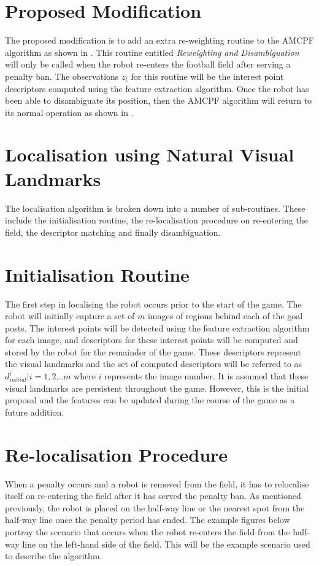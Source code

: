 \section{Proposed Modification}
\label{sec:modification}
The proposed modification is to add an extra re-weighting routine to the AMCPF algorithm as shown in . This routine entitled \textit{Reweighting and Disambiguation} will only be called when the robot re-enters the football field after serving a penalty ban. The observations $z_t$ for this routine will be the interest point descriptors computed using the feature extraction algorithm. Once the robot has been able to disambiguate its position, then the AMCPF algorithm will return to its normal operation as shown in .\\

\section{Localisation using Natural Visual Landmarks}
\label{sec:localisationNaturalVisualLandmarks}
The localisation algorithm is broken down into a number of sub-routines. These include the initialisation routine, the re-localisation procedure on re-entering the field, the descriptor matching and finally disambiguation.\\

\section{Initialisation Routine}
\label{sec:initialisation}
The first step in localising the robot occurs prior to the start of the game. The robot will initially capture a set of $m$ images of regions behind each of the goal posts. The interest points will be detected using the feature extraction algorithm for each image, and descriptors for these interest points will be computed and stored by the robot for the remainder of the game. These descriptors represent the visual landmarks and the set of computed descriptors will be referred to as $d_{initial}^i |i = 1,2...m$ where $i$ represents the image number. It is assumed that these visual landmarks are persistent throughout the game. However, this is the initial proposal and the features can be updated during the course of the game as a future addition.\\

\section{Re-localisation Procedure}
\label{sec:relocalisation}
When a penalty occurs and a robot is removed from the field, it has to relocalise itself on re-entering the field after it has served the penalty ban. As mentioned previously, the robot is placed on the half-way line or the nearest spot from the half-way line once the penalty period has ended. The example figures below portray the scenario that occurs when the robot re-enters the field from the half-way line on the left-hand side of the field. This will be the example scenario used to describe the algorithm.\\

